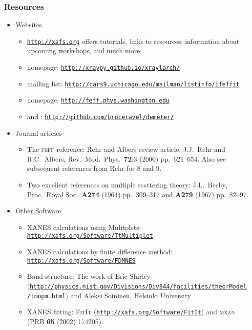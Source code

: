 \documentclass[10pt, xcolor=x11names, compress]{beamer}
\begin{document}
\begin{frame}
  \frametitle{Resources}
  \begin{itemize}
  \item Websites
    \begin{itemize}
    \item \scriptsize
      \href{http://xafs.org}{\color{Blue4}\texttt{http://xafs.org}}
      offers tutorials, links to resources, information about upcoming
      workshops, and much more
    \item \scriptsize {\larch} homepage:
      \href{http://xraypy.github.io/xraylarch/}
      {\color{Blue4}\texttt{http://xraypy.github.io/xraylarch/}}
    \item \scriptsize {\ifeffit} mailing list:
      \href{http://cars9.uchicago.edu/mailman/listinfo/ifeffit}
      {\color{Blue4}\texttt{http://cars9.uchicago.edu/mailman/listinfo/ifeffit}}
    \item \scriptsize {\feff} homepage:
      \href{http://feff.phys.washington.edu}
      {\color{Blue4}\texttt{http://feff.phys.washington.edu}}
    \item \scriptsize {\athena} and {\artemis}:
      \href{http://github.com/bruceravel/demeter}
      {\color{Blue4}\texttt{http://github.com/bruceravel/demeter/}}
    \end{itemize}
  \item Journal articles
    \begin{itemize}
    \item \scriptsize The \textsc{feff} reference: Rehr and Albers
      review article: J.J.~Rehr and R.C.~Albers, Rev.\ Mod.\ Phys.\
      \textbf{72}:3 (2000) pp.\ 621--654.  Also see subsequent
      references from Rehr for {\feff}8 and {\feff}9.
    \item \scriptsize Two excellent references on multiple scattering theory:
      J.L.~Beeby, Proc.\ Royal Soc.\ \textbf{A274} (1964) pp.\
      309--317 and \textbf{A279} (1967) pp.\ 82--97.
    \end{itemize}
  \item Other Software
    \begin{itemize}
    \item \scriptsize XANES calculations using Mulitplets:
      \href{http://xafs.org/Software/TtMultiplet}
      {\color{Blue4}\texttt{http://xafs.org/Software/TtMultiplet}}
    \item \scriptsize XANES calculations by finite difference method:
      \href{http://xafs.org/Software/FDMNES}
      {\color{Blue4}\texttt{http://xafs.org/Software/FDMNES}}
    \item \scriptsize Band structure: The work of Eric Shirley
      (\href{http://physics.nist.gov/Divisions/Div844/facilities/theorModel/tmopm.html}
      {\color{Blue4}\tiny \texttt{http://physics.nist.gov/Divisions/Div844/facilities/theorModel/tmopm.html}}) and
      Aleksi Soininen, Helsinki University
    \item \scriptsize XANES fitting: \textsc{FitIt} (\href{http://xafs.org/Software/FitIt}{\color{Blue4}\texttt{http://xafs.org/Software/FitIt}})
      and \textsc{mxan} (PRB \textbf{65} (2002) 174205).
    \end{itemize}
  \end{itemize}
\end{frame}
\end{document}
